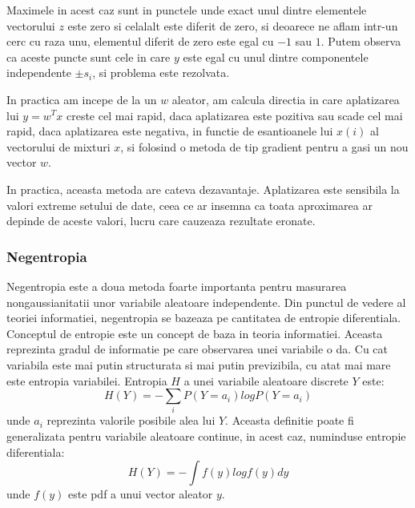 \documentclass[12pt,oneside]{article}
\begin{document}
Maximele in acest caz sunt in punctele unde exact unul dintre elementele vectorului $z$ este zero si celalalt este diferit de zero, si deoarece ne aflam intr-un cerc cu raza unu, elementul diferit de zero este egal cu $-1$ sau $1$. Putem observa ca aceste puncte sunt cele in care $y$ este egal cu unul dintre componentele independente $\pm s_i$, si problema este rezolvata.

In practica am incepe de la un $w$ aleator, am calcula directia in care aplatizarea lui $y=w^Tx$ creste cel mai rapid, daca aplatizarea este pozitiva sau scade cel mai rapid, daca aplatizarea este negativa, in functie de esantioanele lui $x(i)$ al vectorului de mixturi $x$, si folosind o metoda de tip gradient pentru a gasi un nou vector $w$.

In practica, aceasta metoda are cateva dezavantaje. Aplatizarea este sensibila la valori extreme setului de date, ceea ce ar insemna ca toata aproximarea ar depinde de aceste valori, lucru care cauzeaza rezultate eronate.

\subsubsection{Negentropia}
Negentropia este a doua metoda foarte importanta pentru masurarea nongaussianitatii unor variabile aleatoare independente. Din punctul de vedere al teoriei informatiei, negentropia se bazeaza pe cantitatea de entropie diferentiala. Conceptul de entropie este un concept de baza in teoria informatiei. Aceasta reprezinta gradul de informatie pe care observarea unei variabile o da. Cu cat variabila este mai putin structurata si mai putin previzibila, cu atat mai mare este entropia variabilei. Entropia $H$ a unei variabile aleatoare discrete $Y$ este:
\begin{equation}
	H(Y)=-\sum_i P(Y=a_i)log P(Y=a_i)
\end{equation}
unde $a_i$ reprezinta valorile posibile alea lui $Y$. Aceasta definitie poate fi generalizata pentru variabile aleatoare continue, in acest caz, numinduse entropie diferentiala:
\begin{equation}
H(Y)=-\int f(y) logf(y)dy	
\end{equation}
unde $f(y)$ este pdf a unui vector aleator $y$.
\end{document}
